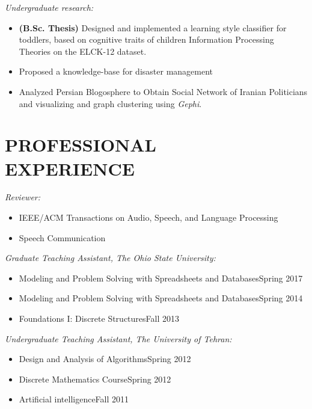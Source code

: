 \documentclass[margin, 10pt]{res}
\begin{document}
\begin{resume}
\begin{itemize}
\end{itemize}

\textit{Undergraduate research:}
\begin{itemize}
\item \textbf{(B.Sc. Thesis)} Designed and implemented a learning style classifier for toddlers, based on cognitive traits of children Information Processing Theories on the ELCK-12 dataset.
\item Proposed a knowledge-base for disaster management
\item Analyzed Persian Blogosphere to Obtain Social Network of Iranian Politicians and visualizing and graph clustering using \textit{Gephi}.
\end{itemize}

\section{PROFESSIONAL \\ EXPERIENCE}
\textit{Reviewer:}
\begin{itemize}
\item IEEE/ACM Transactions on Audio, Speech, and Language Processing
\item Speech Communication
\end{itemize}

\textit{Graduate Teaching Assistant, The Ohio State University:}
\begin{itemize}
\item Modeling and Problem Solving with Spreadsheets and Databases\hfill Spring 2017
\item Modeling and Problem Solving with Spreadsheets and Databases\hfill Spring 2014 
\item Foundations I: Discrete Structures\hfill Fall 2013
\end{itemize}
\textit{Undergraduate Teaching Assistant, The University of Tehran:}
\begin{itemize}
\item Design and Analysis of Algorithms\hfill Spring 2012 
\item Discrete Mathematics Course\hfill Spring 2012
\item Artificial intelligence\hfill Fall 2011
\end{itemize}




\end{resume}
\end{document}
